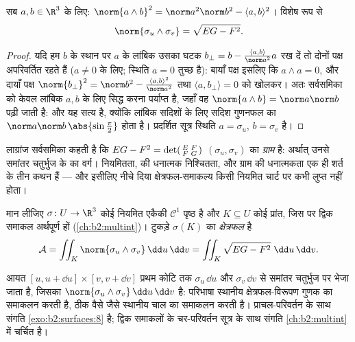\begin{lemma}[लाग्रांज सर्वसमिका]\label{lem:b2:surfaces:lagrange}
सब $a, b \in \R^3$ के लिए:
$\norm{a \wedge b}^2 = \norm a^2 \norm b^2 - \langle a, b\rangle^2$।
विशेष रूप से
\[
\norm{\sigma_u \wedge \sigma_v} = \sqrt{EG - F^2}.
\]
\end{lemma}

\begin{proof}
यदि हम $b$ के स्थान पर $a$ के लांबिक उसका घटक $b_\perp
= b - \frac{\langle a, b\rangle}{\norm a^2}a$ रख दें
तो दोनों पक्ष अपरिवर्तित रहते हैं ($a \neq 0$ के लिए; स्थिति $a = 0$ तुच्छ
है): बायाँ पक्ष इसलिए कि $a \wedge a = 0$, और दायाँ पक्ष $\norm
{b_\perp}^2 = \norm b^2 - \frac{\langle a,b\rangle^2}{\norm a^2}$ तथा
$\langle a, b_\perp\rangle = 0$ को खोलकर। अतः सर्वसमिका को केवल लांबिक $a, b$ के लिए सिद्ध
करना पर्याप्त है, जहाँ वह $\norm{a \wedge
b} = \norm a \norm b$ पढ़ी जाती है: और यह सत्य है,
क्योंकि लांबिक सदिशों के लिए सदिश गुणनफल का  $\norm a\norm b\,\abs{\sin\frac\pi2}$ होता है।
प्रदर्शित सूत्र स्थिति $a = \sigma_u$, $b = \sigma_v$ है।
\end{proof}

\begin{remark}
लाग्रांज सर्वसमिका कहती है कि $EG - F^2 = \det\begin{psmallmatrix}
E & F\\ F & G\end{psmallmatrix}$ $(\sigma_u, \sigma_v)$ का \emph{ग्राम }
है: अर्थात् उनसे  समांतर चतुर्भुज के  का वर्ग।
नियमितता,  की धनात्मक निश्चितता, और ग्राम  की
धनात्मकता एक ही शर्त के तीन कथन हैं --- और इसीलिए नीचे दिया
क्षेत्रफल-समाकल्य किसी नियमित चार्ट पर कभी लुप्त नहीं होता।
\end{remark}

\begin{definition}[क्षेत्रफल]\label{def:b2:surfaces:area}
मान लीजिए $\sigma \colon U \to \R^3$ कोई नियमित एकैकी $\mathcal{C}^1$ पृष्ठ है और $K \subseteq U$ कोई 
प्रांत, जिस पर द्विक समाकल अर्थपूर्ण हों (\cref{ch:b2:multint})। टुकड़े $\sigma(K)$ का
\emph{क्षेत्रफल} है
\[
\mathcal{A}
= \iint_K \norm{\sigma_u \wedge \sigma_v}\,\dd u\,\dd v
= \iint_K \sqrt{EG - F^2}\;\dd u\,\dd v .
\]
\end{definition}

\begin{remark}[यह सूत्र क्यों]
आयत $[u, u + \dd u] \times [v, v + \dd v]$ प्रथम कोटि तक $\sigma_u\,\dd u$ और $\sigma_v\,\dd v$ से  समांतर
चतुर्भुज पर भेजा जाता है, जिसका  $\norm{\sigma_u \wedge
\sigma_v}\,\dd u\,\dd v$ है: परिभाषा
स्थानीय क्षेत्रफल-विरूपण गुणक का समाकलन करती है, ठीक वैसे जैसे
 स्थानीय चाल का समाकलन करती है। प्राचल-परिवर्तन के साथ
संगति \cref{exo:b2:surfaces:8} है; द्विक समाकलों के चर-परिवर्तन सूत्र के साथ संगति
\cref{ch:b2:multint} में चर्चित है।
\end{remark}

